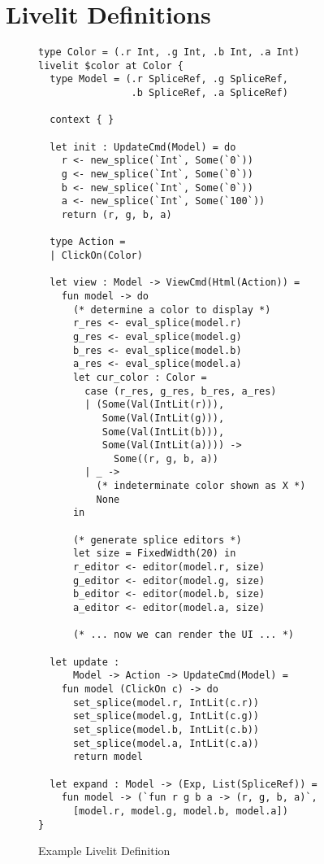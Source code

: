 \section{Livelit Definitions}\label{sec:livelit-definitions}

\begin{figure}
\begin{lstlisting}[xleftmargin=0.2cm]
type Color = (.r Int, .g Int, .b Int, .a Int)
livelit $color at Color {
  type Model = (.r SpliceRef, .g SpliceRef, 
                .b SpliceRef, .a SpliceRef)

  context { }

  let init : UpdateCmd(Model) = do 
    r <- new_splice(`Int`, Some(`0`))
    g <- new_splice(`Int`, Some(`0`))
    b <- new_splice(`Int`, Some(`0`))
    a <- new_splice(`Int`, Some(`100`))
    return (r, g, b, a)

  type Action = 
  | ClickOn(Color)

  let view : Model -> ViewCmd(Html(Action)) = 
    fun model -> do 
      (* determine a color to display *)
      r_res <- eval_splice(model.r)
      g_res <- eval_splice(model.g)
      b_res <- eval_splice(model.b)
      a_res <- eval_splice(model.a)
      let cur_color : Color = 
        case (r_res, g_res, b_res, a_res) 
        | (Some(Val(IntLit(r))), 
           Some(Val(IntLit(g))), 
           Some(Val(IntLit(b))), 
           Some(Val(IntLit(a)))) -> 
             Some((r, g, b, a))
        | _ -> 
          (* indeterminate color shown as X *)
          None 
      in 
      
      (* generate splice editors *)
      let size = FixedWidth(20) in 
      r_editor <- editor(model.r, size)
      g_editor <- editor(model.g, size)
      b_editor <- editor(model.b, size)
      a_editor <- editor(model.a, size)
      
      (* ... now we can render the UI ... *)
    
  let update : 
      Model -> Action -> UpdateCmd(Model) =
    fun model (ClickOn c) -> do 
      set_splice(model.r, IntLit(c.r))
      set_splice(model.g, IntLit(c.g))
      set_splice(model.b, IntLit(c.b))
      set_splice(model.a, IntLit(c.a))
      return model
  
  let expand : Model -> (Exp, List(SpliceRef)) = 
    fun model -> (`fun r g b a -> (r, g, b, a)`, 
      [model.r, model.g, model.b, model.a])
}
\end{lstlisting}
\vspace{-8px}
\caption{Example Livelit Definition}
\label{fig:color-impl}
\end{figure}

